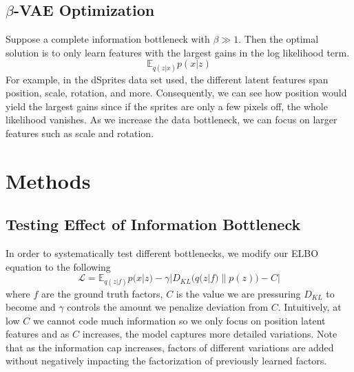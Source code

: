 \documentclass{article}
\begin{document}
\subsection{$\beta$-VAE Optimization}
Suppose a complete information bottleneck with $\beta\gg1$. Then the optimal solution is to only learn features with the largest gains in the log likelihood term.
\begin{equation}
    \mathbb{E}_{q(z|x)}p(x|z)
\end{equation}
For example, in the dSprites data set used, the different latent features span position, scale, rotation, and more. Consequently, we can see how position would yield the largest gains since if the sprites are only a few pixels off, the whole likelihood vanishes. As we increase the data bottleneck, we can focus on larger features such as scale and rotation.

\section{Methods}
\subsection{Testing Effect of Information Bottleneck}
In order to systematically test different bottlenecks, we modify our ELBO equation to the following 
\begin{equation}
    \mathcal{L}= \mathbb{E}_{q(z|f)}p(x|z) -\gamma|D_{KL}(q(z|f)\parallel p(z))-C|
\end{equation}
where $f$ are the ground truth factors, $C$ is the value we are pressuring $D_{KL}$ to become and $\gamma$ controls the amount we penalize deviation from $C$. Intuitively, at low $C$ we cannot code much information so we only focus on position latent features and as $C$ increases, the model captures more detailed variations. Note that as the information cap increases, factors of different variations are added without negatively impacting the factorization of previously learned factors.
\end{document}
